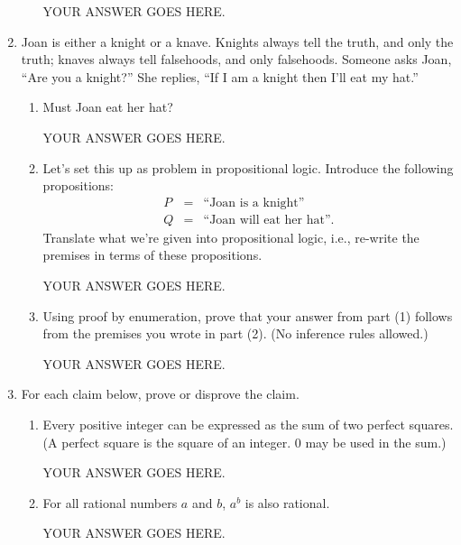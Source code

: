 \documentclass[11pt,fleqn]{article}
\begin{document}
\begin{enumerate}
\begin{enumerate}
YOUR ANSWER GOES HERE.

\end{enumerate}

\item
Joan is either a knight or a knave.
Knights always tell the truth, and only the truth;
knaves always tell falsehoods, and only falsehoods.
Someone asks Joan, ``Are you a knight?''  She replies,
``If I am a knight then I'll eat my hat.''
\begin{enumerate}
\item Must Joan eat her hat?

YOUR ANSWER GOES HERE.

\item Let's set this up as problem in propositional logic.
Introduce the following propositions:
\begin{eqnarray}
P &=& \text{``Joan is a knight''}\\
Q &=& \text{``Joan will eat her hat''}.
\end{eqnarray}
Translate what we're given into propositional logic,
i.e., re-write the premises in terms of these propositions.

YOUR ANSWER GOES HERE.

\item Using proof by enumeration,
prove that your answer from part (1) follows from the premises
you wrote in part (2).
(No inference rules allowed.)

YOUR ANSWER GOES HERE.

\end{enumerate}

\item
For each claim below,
prove or disprove the claim.
\begin{enumerate}
\item Every positive integer can be expressed as the sum of two perfect squares. 
(A perfect square is the square of an integer. 0 may be used in the sum.)

YOUR ANSWER GOES HERE.

\item For all rational numbers $a$ and $b$, $a^b$ is also rational.

YOUR ANSWER GOES HERE.

\end{enumerate}

\end{enumerate}
\end{document}
